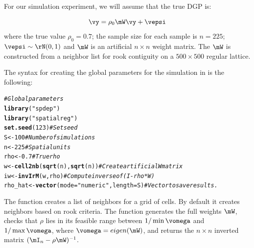 \documentclass[english,12pt]{book}\usepackage[]{graphicx}\usepackage[]{xcolor}
\makeatletter
\newcommand{\hlnum}[1]{\textcolor[rgb]{0.686,0.059,0.569}{#1}}%
\newcommand{\hlstr}[1]{\textcolor[rgb]{0.192,0.494,0.8}{#1}}%
\newcommand{\hlcom}[1]{\textcolor[rgb]{0.678,0.584,0.686}{\textit{#1}}}%
\newcommand{\hlstd}[1]{\textcolor[rgb]{0.345,0.345,0.345}{#1}}%
\newcommand{\hlkwb}[1]{\textcolor[rgb]{0.69,0.353,0.396}{#1}}%
\newcommand{\hlkwc}[1]{\textcolor[rgb]{0.333,0.667,0.333}{#1}}%
\newcommand{\hlkwd}[1]{\textcolor[rgb]{0.737,0.353,0.396}{\textbf{#1}}}%
\newenvironment{kframe}{%
 \def\at@end@of@kframe{}%
 \ifinner\ifhmode%
  \def\at@end@of@kframe{\end{minipage}}%
  \begin{minipage}{\columnwidth}%
 \fi\fi%
 \def\FrameCommand##1{\hskip\@totalleftmargin \hskip-\fboxsep
 \colorbox{shadecolor}{##1}\hskip-\fboxsep
     \hskip-\linewidth \hskip-\@totalleftmargin \hskip\columnwidth}%
 \MakeFramed {\advance\hsize-\width
   \@totalleftmargin\z@ \linewidth\hsize
   \@setminipage}}%
 {\par\unskip\endMakeFramed%
 \at@end@of@kframe}
\newenvironment{knitrout}{}{} %
\makeatother
\begin{document}
For our simulation experiment, we will assume that the true DGP is:

\begin{equation}
  \vy = \rho_0\mW\vy + \vepsi
\end{equation}
%
where the true value $\rho_0 = 0.7$; the sample size for each sample is $n = 225$; $\vepsi\sim \rN(0, 1)$ and $\mW$ is an artificial $n\times n$ weight matrix. The $\mW$ is constructed from a neighbor list for rook contiguity on a $500 \times 500$ regular lattice. 

The syntax for creating the global parameters for the simulation in  is the following: 

\begin{knitrout}
\color{fgcolor}\begin{kframe}
\begin{alltt}
\hlcom{# Global parameters}
\hlkwd{library}\hlstd{(}\hlstr{"spdep"}\hlstd{)}
\hlkwd{library}\hlstd{(}\hlstr{"spatialreg"}\hlstd{)}
\hlkwd{set.seed}\hlstd{(}\hlnum{123}\hlstd{)}                                   \hlcom{# Set seed}
\hlstd{S}       \hlkwb{<-} \hlnum{100}                                  \hlcom{# Number of simulations}
\hlstd{n}       \hlkwb{<-} \hlnum{225}                                  \hlcom{# Spatial units}
\hlstd{rho}     \hlkwb{<-} \hlnum{0.7}                                  \hlcom{# True rho}
\hlstd{w}       \hlkwb{<-} \hlkwd{cell2nb}\hlstd{(}\hlkwd{sqrt}\hlstd{(n),} \hlkwd{sqrt}\hlstd{(n))}            \hlcom{# Create artificial W matrix}
\hlstd{iw}      \hlkwb{<-} \hlkwd{invIrM}\hlstd{(w, rho)}                       \hlcom{# Compute inverse of (I - rho*W)}
\hlstd{rho_hat} \hlkwb{<-} \hlkwd{vector}\hlstd{(}\hlkwc{mode} \hlstd{=} \hlstr{"numeric"}\hlstd{,} \hlkwc{length} \hlstd{= S)} \hlcom{# Vector to save results.}
\end{alltt}
\end{kframe}
\end{knitrout}

The function  creates a list of neighbors for a grid of cells. By default it creates neighbors based on rook criteria. The  function generates the full weights $\mW$, checks that $\rho$ lies in its feasible range between $1 / \min{\vomega}$ and $1 / \max{\vomega}$, where $\vomega = eigen (\mW)$, and returns the $n\times n$ inverted matrix $(\mI_n - \rho\mW)^{-1}$. 
\end{document}
